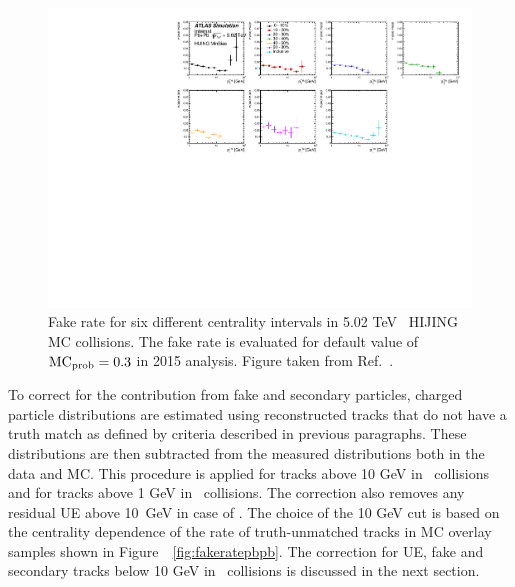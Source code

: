 \begin{figure}
\centering
\includegraphics[width=1.\textwidth]{figures/main/performance/fake_rate_hijingMB.pdf}
\caption{ Fake rate for six different centrality intervals in 5.02 TeV \pbpb\ HIJING MC collisions.
The fake rate is evaluated for default value of $\mathrm{MC_{\rm prob}} = 0.3$ in 2015 analysis.
Figure taken from Ref.~\cite{Sickles:2235420}.}
\label{fig:fakeratehijing}
\end{figure}


To correct for the contribution from fake and secondary particles, charged particle distributions are estimated using reconstructed tracks that do not have a truth match as defined by criteria described in previous paragraphs.
These distributions are then subtracted from the measured distributions both in the data and MC.
This procedure is applied for tracks above 10 GeV in \PbPb\ collisions and for tracks above 1 GeV in \pp\ collisions.
The correction also removes any residual UE above 10~GeV in case of \PbPb.
The choice of the 10 GeV cut is based on the centrality dependence of the rate of truth-unmatched tracks in MC overlay samples shown in Figure~~\ref{fig:fakeratepbpb}.
The correction for UE, fake and secondary tracks below 10 GeV in \PbPb\ collisions is discussed in the next section.


